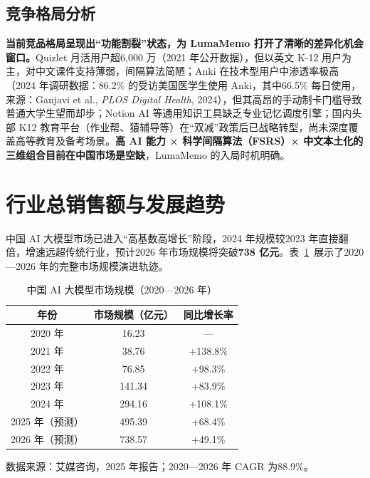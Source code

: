 \subsection{竞争格局分析}

\textbf{当前竞品格局呈现出“功能割裂”状态，为 LumaMemo 打开了清晰的差异化机会窗口。}Quizlet 月活用户超6,000 万（2021 年公开数据），但以英文 K-12 用户为主，对中文课件支持薄弱，间隔算法简陋；Anki 在技术型用户中渗透率极高（2024 年调研数据：86.2\% 的受访美国医学生使用 Anki，其中66.5\% 每日使用，来源：Ganjavi et al., \textit{PLOS Digital Health}, 2024），但其高昂的手动制卡门槛导致普通大学生望而却步；Notion AI 等通用知识工具缺乏专业记忆调度引擎；国内头部 K12 教育平台（作业帮、猿辅导等）在“双减”政策后已战略转型，尚未深度覆盖高等教育及备考场景。\textbf{高 AI 能力 × 科学间隔算法（FSRS）× 中文本土化的三维组合目前在中国市场是空缺}，LumaMemo 的入局时机明确。

\section{行业总销售额与发展趋势}

中国 AI 大模型市场已进入“高基数高增长”阶段，2024 年规模较2023 年直接翻倍，增速远超传统行业，预计2026 年市场规模将突破\textbf{738 亿元}。表~\ref{tab:ai_market}~展示了2020—2026 年的完整市场规模演进轨迹。

\begin{table}[htbp]
  \centering
  \caption{中国 AI 大模型市场规模（2020—2026 年）}
  \label{tab:ai_market}
  \begin{tabular}{ccc}
    \toprule
    \textbf{年份} & \textbf{市场规模（亿元）} & \textbf{同比增长率} \\
    \midrule
    2020 年 & 16.23  & —        \\
    2021 年 & 38.76  & +138.8\% \\
    2022 年 & 76.85  & +98.3\%  \\
    2023 年 & 141.34 & +83.9\%  \\
    2024 年 & 294.16 & +108.1\% \\
    2025 年（预测）& 495.39 & +68.4\%  \\
    2026 年（预测）& 738.57 & +49.1\%  \\
    \bottomrule
  \end{tabular}
  \begin{flushleft}
    \footnotesize 数据来源：艾媒咨询，2025 年报告；2020—2026 年 CAGR 为88.9\%。
  \end{flushleft}
\end{table}

